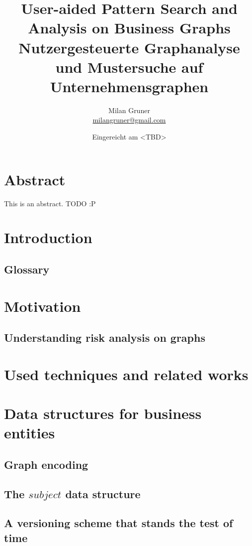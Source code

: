 \documentclass[
        a4paper,     %
        titlepage,   %
        twoside,     %
        parskip      %
        ]{scrartcl}  %
\title{User-aided Pattern Search and Analysis on Business Graphs
\\ \bigskip
\large{Nutzergesteuerte Graphanalyse und Mustersuche auf Unternehmensgraphen}}
\author{Milan Gruner\\{\small{\url{milangruner@gmail.com}}}}
\date{Eingereicht am <TBD>}
\begin{document}
  \maketitle    %
  \clearpage %

  \section*{Abstract}
  This is an abstract. TODO :P

  \tableofcontents
  \clearpage


  \section{Introduction}
    \subsection{Glossary}
  \section{Motivation}
    \subsection{Understanding risk analysis on graphs}
  \section{Used techniques and related works}
  \section{Data structures for business entities}
    \subsection{Graph encoding}
    \subsection{The $subject$ data structure}
    \subsection{A versioning scheme that stands the test of time}
\end{document}
